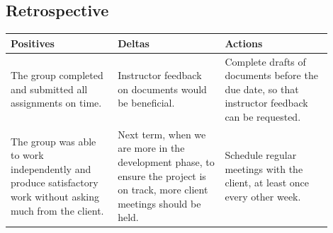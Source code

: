 \documentclass[letterpaper, onecolumn, draftclsnofoot, 10pt, compsoc]{IEEEtran}
\begin{document}
\begin{singlespace}
\section{Retrospective}
    \begin{tabular}{|p{0.3\linewidth} | p{0.3\linewidth} | p{0.3\linewidth}|}
    \hline
    \centering Positives & \centering Deltas & \centering Actions \tabularnewline
    \hline
    The group completed and submitted all assignments on time. & 
    Instructor feedback on documents would be beneficial. & 
    Complete drafts of documents before the due date, so that instructor feedback can be requested. 
    \tabularnewline
     \hline
    The group was able to work independently and produce satisfactory work without asking much from the client. & 
    Next term, when we are more in the development phase, to ensure the project is on track, more client meetings should be held. & 
    Schedule regular meetings with the client, at least once every other week.
    \tabularnewline
    \hline
    \end{tabular}
\end{singlespace}

\newpage
%
%
\end{document}
